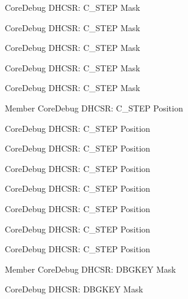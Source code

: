\begin{DoxyRefList}
\label{deprecated__deprecated000180}%
%
Core\+Debug DHCSR\+: C\+\_\+\+STEP Mask 

\label{deprecated__deprecated000322}%
%
Core\+Debug DHCSR\+: C\+\_\+\+STEP Mask 

\label{deprecated__deprecated000398}%
%
Core\+Debug DHCSR\+: C\+\_\+\+STEP Mask 

\label{deprecated__deprecated000487}%
%
Core\+Debug DHCSR\+: C\+\_\+\+STEP Mask 

\label{deprecated__deprecated000036}%
%
Core\+Debug DHCSR\+: C\+\_\+\+STEP Mask  
\item[Member \doxylink{group__CMSIS__CoreDebug_gae1fc39e80de54c0339cbb1b298a9f0f9}{Core\+Debug\+\_\+\+DHCSR\+\_\+\+C\+\_\+\+STEP\+\_\+\+Pos} ]\label{deprecated__deprecated000588}%
%
Core\+Debug DHCSR\+: C\+\_\+\+STEP Position 

\label{deprecated__deprecated000035}%
%
Core\+Debug DHCSR\+: C\+\_\+\+STEP Position 

\label{deprecated__deprecated000486}%
%
Core\+Debug DHCSR\+: C\+\_\+\+STEP Position 

\label{deprecated__deprecated000397}%
%
Core\+Debug DHCSR\+: C\+\_\+\+STEP Position 

\label{deprecated__deprecated000179}%
%
Core\+Debug DHCSR\+: C\+\_\+\+STEP Position 

\label{deprecated__deprecated000321}%
%
Core\+Debug DHCSR\+: C\+\_\+\+STEP Position 

\label{deprecated__deprecated000262}%
%
Core\+Debug DHCSR\+: C\+\_\+\+STEP Position 

\label{deprecated__deprecated000123}%
%
Core\+Debug DHCSR\+: C\+\_\+\+STEP Position  
\item[Member \doxylink{group__CMSIS__CoreDebug_ga1ce997cee15edaafe4aed77751816ffc}{Core\+Debug\+\_\+\+DHCSR\+\_\+\+DBGKEY\+\_\+\+Msk} ]\label{deprecated__deprecated000160}%
%
Core\+Debug DHCSR\+: DBGKEY Mask 

\label{deprecated__deprecated000106}%
%
Core\+Debug DHCSR\+: DBGKEY Mask 


\end{DoxyRefList}
